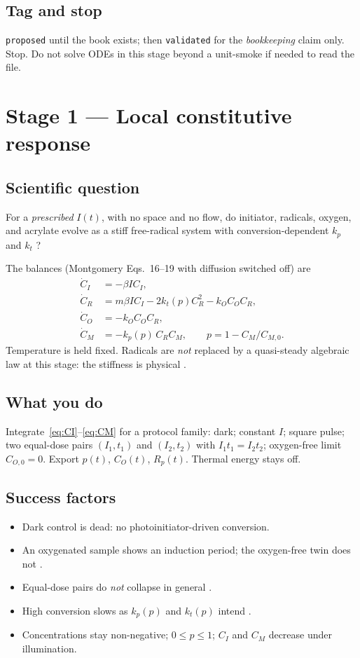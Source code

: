 \documentclass[11pt,a4paper]{article}
\newcommand{\tagproposed}{\texttt{proposed}}
\newcommand{\tagvalid}{\texttt{validated}}
\begin{document}
\subsection{Tag and stop}
\tagproposed{} until the book exists; then \tagvalid{} for the \emph{bookkeeping} claim only.
Stop. Do not solve ODEs in this stage beyond a unit-smoke if needed to read the file.

\section{Stage 1 --- Local constitutive response}

\subsection{Scientific question}
For a \emph{prescribed} $I(t)$, with no space and no flow, do initiator, radicals, oxygen, and acrylate evolve as a stiff free-radical system with conversion-dependent $k_p$ and $k_t$ \citep{Montgomery2022}?

The balances (Montgomery Eqs.~16--19 with diffusion switched off) are
\begin{align}
  \dot C_I &= -\beta I C_I, \label{eq:CI}\\
  \dot C_R &= m\beta I C_I - 2k_t(p)C_R^2 - k_O C_O C_R, \label{eq:CR}\\
  \dot C_O &= -k_O C_O C_R, \label{eq:CO}\\
  \dot C_M &= -k_p(p)\,C_R C_M, \qquad p=1-C_M/C_{M,0}. \label{eq:CM}
\end{align}
Temperature is held fixed.
Radicals are \emph{not} replaced by a quasi-steady algebraic law at this stage: the stiffness is physical \citep{Montgomery2022,Dobson2024}.

\subsection{What you do}
Integrate~\eqref{eq:CI}--\eqref{eq:CM} for a protocol family: dark; constant $I$; square pulse; two equal-dose pairs $(I_1,t_1)$ and $(I_2,t_2)$ with $I_1 t_1=I_2 t_2$; oxygen-free limit $C_{O,0}=0$.
Export $p(t)$, $C_O(t)$, $R_p(t)$.
Thermal energy stays off.

\subsection{Success factors}
\begin{itemize}
  \item Dark control is dead: no photoinitiator-driven conversion.
  \item An oxygenated sample shows an induction period; the oxygen-free twin does not \citep{Decker1985,Dendukuri2008}.
  \item Equal-dose pairs do \emph{not} collapse in general \citep{Wydra2014,Lin2019}.
  \item High conversion slows as $k_p(p)$ and $k_t(p)$ intend \citep{Montgomery2022,Anseth1994}.
  \item Concentrations stay non-negative; $0\le p\le 1$; $C_I$ and $C_M$ decrease under illumination.
\end{itemize}
\end{document}
